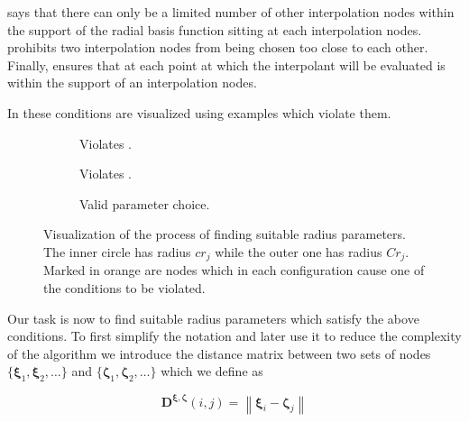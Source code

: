 \documentclass[11pt, a4paper]{article}
\begin{document}
 says that there can only be a limited number of other interpolation nodes within the support of the radial basis function sitting at each interpolation nodes.  prohibits two interpolation nodes from being chosen too close to each other. Finally,  ensures that at each point at which the interpolant will be evaluated is within the support of an interpolation nodes. 

In  these conditions are visualized using examples which violate them.

\begin{figure}[ht]
    \centering
    \begin{subfigure}[b]{.32\linewidth}
        
        \caption{Violates .}\label{fig:radiusparameters1}
    \end{subfigure}
    \begin{subfigure}[b]{.32\linewidth}
        \centering
        
        \caption{Violates .}\label{fig:radiusparameters2}
    \end{subfigure}
    \begin{subfigure}[b]{.32\linewidth}
        
        \caption{Valid parameter choice.}\label{fig:radiusparameters3}
    \end{subfigure}
    \caption{Visualization of the process of finding suitable radius parameters. The inner circle has radius $cr_j$ while the outer one has radius $Cr_j$. Marked in orange are nodes which in each configuration cause one of the conditions to be violated.}
    \label{fig:radiusparameters}
\end{figure}

Our task is now to find suitable radius parameters which satisfy the above conditions. To first simplify the notation and later use it to reduce the complexity of the algorithm we introduce the distance matrix between two sets of nodes $\{\boldsymbol{\xi}_1, \boldsymbol{\xi}_2, \dots\}$
and $\{\boldsymbol{\zeta}_1, \boldsymbol{\zeta}_2, \dots\}$ which we define as

\begin{equation}
    \mathbf{D}^{\boldsymbol{\xi}, \boldsymbol{\zeta}}(i, j) =
        \left\| \boldsymbol{\xi}_i - \boldsymbol{\zeta}_j \right\|
    \label{equ:distance-matrix}
\end{equation}
\end{document}
